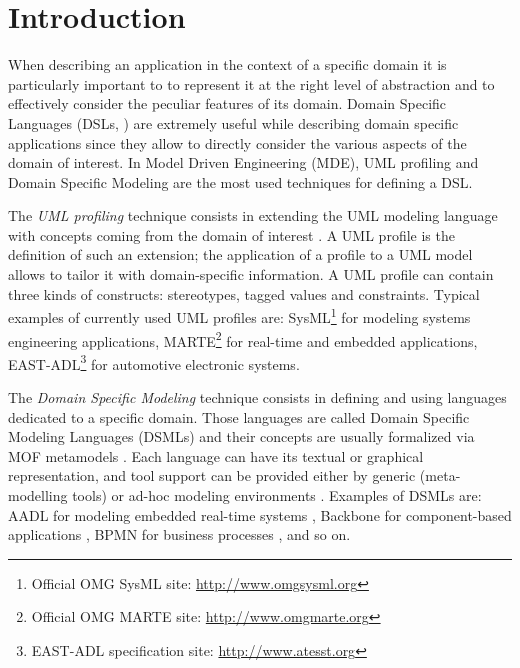 \section{Introduction}\label{sec:intro}

When describing an application in the context of a specific domain it is particularly important to 
to represent it at the right level of abstraction and to effectively consider the peculiar features of its domain.
Domain Specific Languages (DSLs, \cite{FowlerBook}) are extremely useful while describing domain specific applications since they allow to 
directly consider the various aspects of the domain of interest. 
In Model Driven Engineering (MDE), UML profiling \cite{UML} and Domain Specific Modeling \cite{DSML}
are the most used techniques for defining a DSL. 

The \textit{UML profiling} technique consists in extending the UML modeling language with concepts coming from 
the domain of interest \cite{UMLprofile}.
A UML profile is the definition of such an extension; the application of a profile to a UML model allows to tailor it with domain-specific information. A UML profile can contain three kinds of constructs: stereotypes, tagged values and constraints.
Typical examples of currently used UML profiles are: SysML\footnote{Official OMG SysML site: \small{\url{http://www.omgsysml.org}}}
for modeling systems engineering applications, 
MARTE\footnote{Official OMG MARTE site: \small{\url{http://www.omgmarte.org}}} for real-time and embedded applications, 
EAST-ADL\footnote{EAST-ADL specification site: \small{\url{http://www.atesst.org}}} for automotive electronic systems.

The \textit{Domain Specific Modeling} technique consists in defining and using languages dedicated to a specific domain.
Those languages are called Domain Specific Modeling Languages (DSMLs) and their concepts are usually formalized  via MOF metamodels \cite{MOF}.
Each language can have its textual or graphical representation, and tool support can be provided either by generic (meta-modelling tools) or
ad-hoc modeling environments \cite{DSML}. 
Examples of DSMLs are: AADL for modeling embedded real-time systems \cite{aadl}, Backbone for component-based applications \cite{backbone}, BPMN for business processes \cite{BPMN}, and so on. 
 

